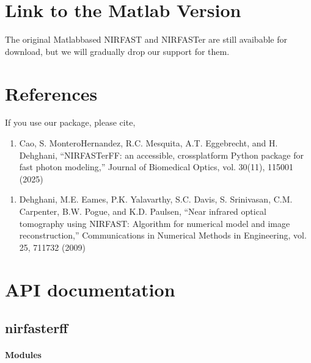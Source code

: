 \documentclass[letterpaper,10pt,english]{sphinxmanual}
\begin{document}
\chapter{Link to the Matlab Version}
\label{\detokenize{index:link-to-the-matlab-version}}
\sphinxAtStartPar
The original Matlab\sphinxhyphen{}based NIRFAST and NIRFASTer are still avaibable for download, but we will gradually drop our support for them.

\sphinxAtStartPar
{}

\sphinxAtStartPar
{}


\chapter{References}
\label{\detokenize{index:references}}
\sphinxAtStartPar
If you use our package, please cite,
\begin{enumerate}
%
\setcounter{enumi}{9}
\item {} 
\sphinxAtStartPar
Cao, S. Montero\sphinxhyphen{}Hernandez, R.C. Mesquita, A.T. Eggebrecht, and H. Dehghani, “NIRFASTerFF: an accessible, cross\sphinxhyphen{}platform Python package for fast photon modeling,” Journal of Biomedical Optics, vol. 30(11), 115001 (2025) 

\end{enumerate}
\begin{enumerate}
%
\setcounter{enumi}{7}
\item {} 
\sphinxAtStartPar
Dehghani, M.E. Eames, P.K. Yalavarthy, S.C. Davis, S. Srinivasan, C.M. Carpenter, B.W. Pogue, and K.D. Paulsen, “Near infrared optical tomography using NIRFAST: Algorithm for numerical model and image reconstruction,” Communications in Numerical Methods in Engineering, vol. 25, 711\sphinxhyphen{}732 (2009) 

\end{enumerate}


\chapter{API documentation}
\label{\detokenize{index:api-documentation}}
\sphinxstepscope


\section{nirfasterff}
\label{\detokenize{_autosummary/nirfasterff:module-nirfasterff}}\label{\detokenize{_autosummary/nirfasterff:nirfasterff}}\label{\detokenize{_autosummary/nirfasterff::doc}}\subsubsection*{Modules}
\end{document}

